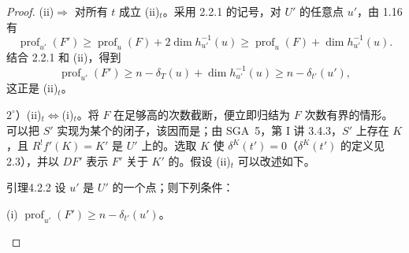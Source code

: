 \begin{proof}
(ii)$\Rightarrow$ 对所有 $t$ 成立 (ii)$_t$。采用 2.2.1 的记号，对 $U'$ 的任意点 $u'$，由 1.16 有
\[
\operatorname{prof}_{u'}(F')\geq\operatorname{prof}_u(F)+2\dim h_{u'}^{-1}(u)
\geq\operatorname{prof}_u(F)+\dim h_{u'}^{-1}(u).
\]
结合 2.2.1 和 (ii)，得到
\[
\operatorname{prof}_{u'}(F')\geq n-\delta_T(u)+\dim h_{u'}^{-1}(u)
\geq n-\delta_{t'}(u'),
\]
这正是 (ii)$_t$。

$2^\circ$）(ii)$_t\Leftrightarrow$(i)$_t$。将 $F$ 在足够高的次数截断，便立即归结为 $F$ 次数有界的情形。可以把 $S'$ 实现为某个的闭子，该因而是；由 SGA~5，第 I 讲 3.4.3，$S'$ 上存在 $K$，且 $R^!f'(K)=K'$ 是 $U'$ 上的。选取 $K$ 使 $\delta^K(t')=0$（$\delta^K(t')$ 的定义见 2.3），并以 $DF'$ 表示 $F'$ 关于 $K'$ 的。假设 (ii)$_t$ 可以改述如下。
\begin{SGAresult}{引理}{4.2.2}
设 $u'$ 是 $U'$ 的一个点；则下列条件：

(i) $\operatorname{prof}_{u'}(F')\geq n-\delta_{t'}(u')$。


\end{SGAresult}
\end{proof}
